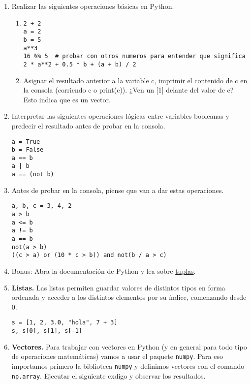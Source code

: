 \documentclass[a4paper,11pt]{article}
\theoremstyle{definition}
\begin{document}
\begin{enumerate}
\item
Realizar las siguientes operaciones básicas en Python.
\begin{enumerate}
\item \begin{lstlisting}
2 + 2
a = 2
b = 5
a**3
16 %% 5  # probar con otros numeros para entender que significa
2 * a**2 + 0.5 * b + (a + b) / 2
\end{lstlisting}
\item Asignar el resultado anterior a la variable c, imprimir el contenido de c en la consola (corriendo c o print(c)). ¿Ven un [1] delante del valor de c? Esto indica que es un vector.
\end{enumerate}

\item Interpretar las siguientes operaciones lógicas entre variables booleanas y predecir el resultado antes de probar en la consola.
\begin{lstlisting}
a = True
b = False
a == b
a | b
a == (not b)
\end{lstlisting}

\item Antes de probar en la consola, piense que van a dar estas operaciones.
\begin{lstlisting}
a, b, c = 3, 4, 2
a > b
a <= b
a != b
a == b
not(a > b)
((c > a) or (10 * c > b)) and not(b / a > c)
\end{lstlisting}

\item Bonus: Abra la documentación de Python y lea sobre \href{https://docs.python.org/es/3/library/stdtypes.html\#tuples}{tuplas}.


\item \textbf{Listas.}
Las listas permiten guardar valores de distintos tipos en forma ordenada y acceder a los distintos elementos por su índice, comenzando desde 0.
\begin{lstlisting}
s = [1, 2, 3.0, "hola", 7 + 3]
s, s[0], s[1], s[-1]
\end{lstlisting}


\item \textbf{Vectores.}
Para trabajar con vectores en Python (y en general para todo tipo de operaciones matemáticas) vamos a usar el paquete \lstinline{numpy}. Para eso importamos primero la biblioteca \lstinline{numpy} y definimos vectores con el comando \lstinline{np.array}. Ejecutar el siguiente cxdigo y observar los resultados.


\end{enumerate}
\end{document}
